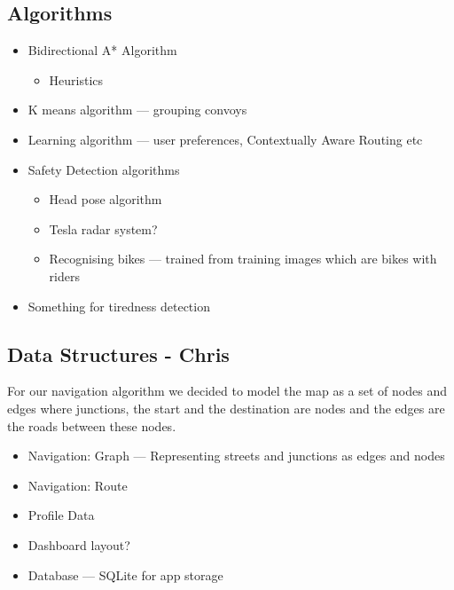 \documentclass{article}
\begin{document}
\subsection{Algorithms}\label{ssec:algorithms}
  \begin{itemize}
      \item Bidirectional A* Algorithm
          \begin{itemize}
              \item Heuristics
          \end{itemize}
      \item K means algorithm --- grouping convoys
      \item Learning algorithm --- user preferences, Contextually Aware Routing etc
      \item Safety Detection algorithms
        \begin{itemize}
            \item Head pose algorithm
            \item Tesla radar system?
            \item Recognising bikes --- trained from training images which are bikes with riders
        \end{itemize}
      \item Something for tiredness detection
  \end{itemize}

\subsection{Data Structures - Chris}\label{ssec:data-structures}
For our navigation algorithm we decided to model the map as a set of nodes and edges where junctions, the start and the destination are nodes and the edges are the roads between these nodes.

  \begin{itemize}
    \item Navigation: Graph --- Representing streets and junctions as edges and nodes
    \item Navigation: Route
    \item Profile Data
    \item Dashboard layout?
    \item Database --- SQLite for app storage
  \end{itemize}
\end{document}
